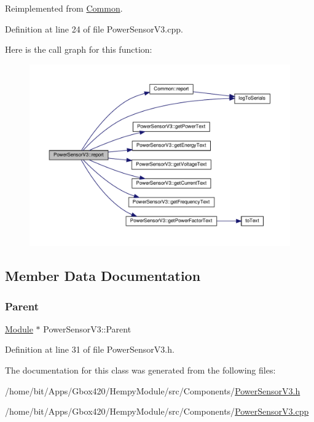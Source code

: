 Reimplemented from \hyperlink{class_common_a9e60e2c26a5f4d72342a59a969954636}{Common}.



Definition at line 24 of file Power\+Sensor\+V3.\+cpp.

Here is the call graph for this function\+:
\nopagebreak
\begin{figure}[H]
\begin{center}
\leavevmode
\includegraphics[width=350pt]{class_power_sensor_v3_ab86f05622f809b34c4af5587024377d1_cgraph}
\end{center}
\end{figure}


\subsection{Member Data Documentation}
\mbox{\label{class_power_sensor_v3_aa7a23932f754042ad07e654a408e8a52}} 
\subsubsection{\texorpdfstring{Parent}{Parent}}
{\footnotesize\ttfamily \hyperlink{class_module}{Module} $\ast$ Power\+Sensor\+V3\+::\+Parent\hspace{0.3cm}{\ttfamily [protected]}}



Definition at line 31 of file Power\+Sensor\+V3.\+h.



The documentation for this class was generated from the following files\+:\begin{DoxyCompactItemize}
\item 
/home/bit/\+Apps/\+Gbox420/\+Hempy\+Module/src/\+Components/\hyperlink{_hempy_module_2src_2_components_2_power_sensor_v3_8h}{Power\+Sensor\+V3.\+h}\item 
/home/bit/\+Apps/\+Gbox420/\+Hempy\+Module/src/\+Components/\hyperlink{_hempy_module_2src_2_components_2_power_sensor_v3_8cpp}{Power\+Sensor\+V3.\+cpp}\end{DoxyCompactItemize}
